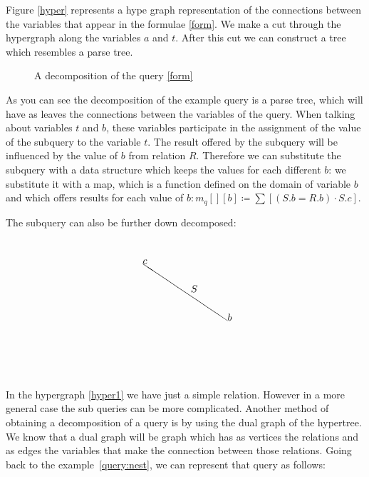 \documentclass[12pt]{article}
\begin{document}
Figure \ref{hyper} represents a hype graph representation of the connections between the variables that appear in the formulae \ref{form}. We make a cut through the hypergraph along the variables $a$ and $t$. After this cut we can construct a tree which resembles a parse tree.

\begin{figure}[htbp]
\begin{center}
\usetikzlibrary{fit}
\end{center}
\caption{A decomposition of the query \ref{form}}
\label{figtree}
\end{figure}
As you can see the decomposition of the example query is a parse tree, which will have as leaves the connections between the variables of the query. When talking about variables $t$ and $b$, these variables participate in the assignment of the value of the subquery to the variable $t$. The result offered by the subquery will be influenced by the value of $b$ from relation $R$. Therefore we can substitute the subquery with a data structure which keeps the values for each different $b$: we substitute it with a map, which is a function defined on the domain of variable $b$ and which offers results for each value of $b: m_q[][b]\coloneqq\sum[(S.b=R.b)\cdot S.c]$.

The subquery can also be further down decomposed:
\begin{align}
\label{hyper1}
\setlength{\unitlength}{1mm}
\begin{picture}(50,50)
\put(40,20){\line(-3,2){30}}
\put(40,20){$b$}
\put(10,40){$c$}
\put(27,30){$S$}
\end{picture}
\end{align}
In the hypergraph \ref{hyper1} we have just a simple relation. However in a more general case the sub queries can be more complicated. Another method of obtaining a decomposition of a query is by using the dual graph of the hypertree. We know that a dual graph will be graph which has as vertices the relations and as edges the variables that make the connection between those relations. Going back to the example~\ref{query:nest}, we can represent that query as follows:
\end{document}
